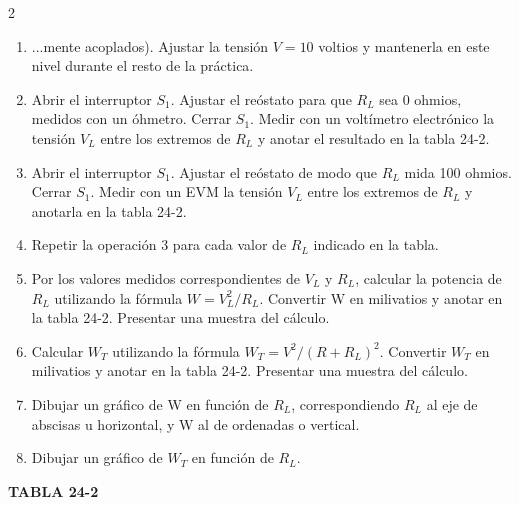 \documentclass[12pt]{article}
\begin{document}
\begin{multicols}{2}
    \begin{enumerate}[label=\textbf{\arabic*.}, start=2]
        \item ...mente acoplados). Ajustar la tensión $V = 10$ voltios y mantenerla en este nivel durante el resto de la práctica.
        \item Abrir el interruptor $S_1$. Ajustar el reóstato para que $R_L$ sea 0 ohmios, medidos con un óhmetro. Cerrar $S_1$. Medir con un voltímetro electrónico la tensión $V_L$ entre los extremos de $R_L$ y anotar el resultado en la tabla 24-2.
        \item Abrir el interruptor $S_1$. Ajustar el reóstato de modo que $R_L$ mida 100 ohmios. Cerrar $S_1$. Medir con un EVM la tensión $V_L$ entre los extremos de $R_L$ y anotarla en la tabla 24-2.
        \item Repetir la operación 3 para cada valor de $R_L$ indicado en la tabla.
        \item Por los valores medidos correspondientes de $V_L$ y $R_L$, calcular la potencia de $R_L$ utilizando la fórmula $W = V_L^2/R_L$. Convertir W en milivatios y anotar en la tabla 24-2. Presentar una muestra del cálculo.
        \item Calcular $W_T$ utilizando la fórmula $W_T = V^2/(R + R_L)^2$. Convertir $W_T$ en milivatios y anotar en la tabla 24-2. Presentar una muestra del cálculo.
        \item Dibujar un gráfico de W en función de $R_L$, correspondiendo $R_L$ al eje de abscisas u horizontal, y W al de ordenadas o vertical.
        \item Dibujar un gráfico de $W_T$ en función de $R_L$.
    \end{enumerate}
    
\end{multicols}

\vspace{3cm}

\begin{center}
    \textbf{TABLA 24-2}
\end{center}
\end{document}
